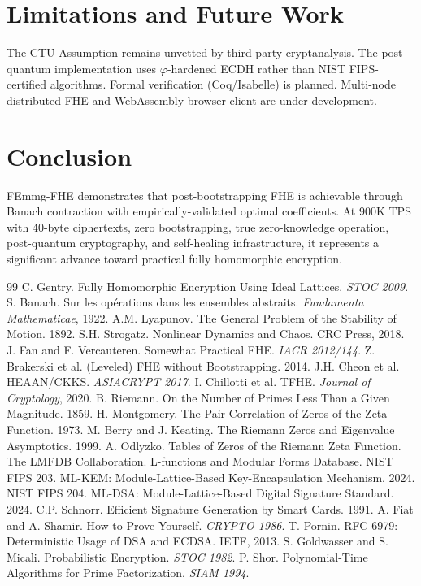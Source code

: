 \documentclass[11pt,a4paper]{article}
\begin{document}
\section{Limitations and Future Work}

The CTU Assumption remains unvetted by third-party cryptanalysis. The post-quantum implementation uses $\varphi$-hardened ECDH rather than NIST FIPS-certified algorithms. Formal verification (Coq/Isabelle) is planned. Multi-node distributed FHE and WebAssembly browser client are under development.

\section{Conclusion}

FEmmg-FHE demonstrates that post-bootstrapping FHE is achievable through Banach contraction with empirically-validated optimal coefficients. At 900K TPS with 40-byte ciphertexts, zero bootstrapping, true zero-knowledge operation, post-quantum cryptography, and self-healing infrastructure, it represents a significant advance toward practical fully homomorphic encryption.

\begin{thebibliography}{99}
 C. Gentry. Fully Homomorphic Encryption Using Ideal Lattices. \textit{STOC 2009}.
 S. Banach. Sur les opérations dans les ensembles abstraits. \textit{Fundamenta Mathematicae}, 1922.
 A.M. Lyapunov. The General Problem of the Stability of Motion. 1892.
 S.H. Strogatz. Nonlinear Dynamics and Chaos. CRC Press, 2018.
 J. Fan and F. Vercauteren. Somewhat Practical FHE. \textit{IACR 2012/144}.
 Z. Brakerski et al. (Leveled) FHE without Bootstrapping. 2014.
 J.H. Cheon et al. HEAAN/CKKS. \textit{ASIACRYPT 2017}.
 I. Chillotti et al. TFHE. \textit{Journal of Cryptology}, 2020.
 B. Riemann. On the Number of Primes Less Than a Given Magnitude. 1859.
 H. Montgomery. The Pair Correlation of Zeros of the Zeta Function. 1973.
 M. Berry and J. Keating. The Riemann Zeros and Eigenvalue Asymptotics. 1999.
 A. Odlyzko. Tables of Zeros of the Riemann Zeta Function.
 The LMFDB Collaboration. L-functions and Modular Forms Database.
 NIST FIPS 203. ML-KEM: Module-Lattice-Based Key-Encapsulation Mechanism. 2024.
 NIST FIPS 204. ML-DSA: Module-Lattice-Based Digital Signature Standard. 2024.
 C.P. Schnorr. Efficient Signature Generation by Smart Cards. 1991.
 A. Fiat and A. Shamir. How to Prove Yourself. \textit{CRYPTO 1986}.
 T. Pornin. RFC 6979: Deterministic Usage of DSA and ECDSA. IETF, 2013.
 S. Goldwasser and S. Micali. Probabilistic Encryption. \textit{STOC 1982}.
 P. Shor. Polynomial-Time Algorithms for Prime Factorization. \textit{SIAM 1994}.
\end{thebibliography}
\end{document}
